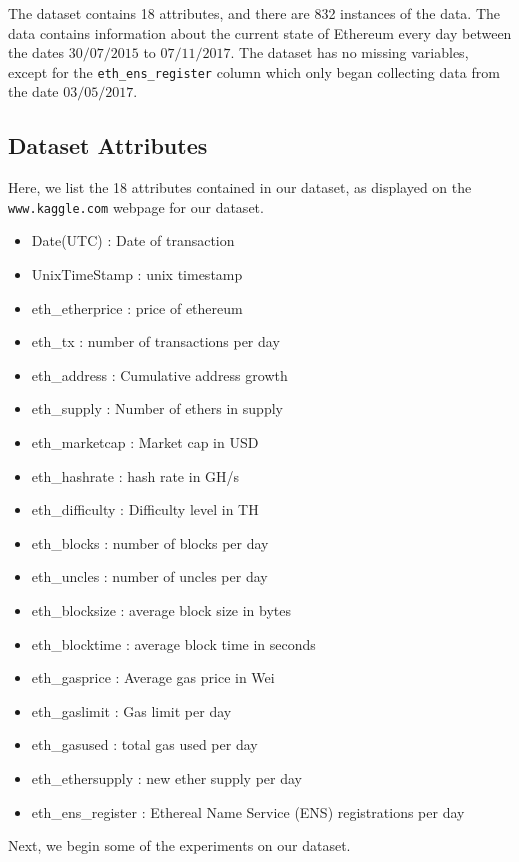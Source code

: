 \documentclass{article}
\begin{document}
The dataset contains 18 attributes, and there are 832 instances of the data. The data contains information about the current state of Ethereum every day between the dates $30/07/2015$ to $07/11/2017$. The dataset has no missing variables, except for the \texttt{eth\_ens\_register} column which only began collecting data from the date $03/05/2017$.

\subsection{Dataset Attributes}
Here, we list the 18 attributes contained in our dataset, as displayed on the \texttt{www.kaggle.com} webpage for our dataset\cite{dataset}.

\begin{center}
\begin{itemize}
\item Date(UTC) : Date of transaction
\item UnixTimeStamp : unix timestamp
\item eth\_etherprice : price of ethereum
\item eth\_tx : number of transactions per day
\item eth\_address : Cumulative address growth
\item eth\_supply : Number of ethers in supply
\item eth\_marketcap : Market cap in USD
\item eth\_hashrate : hash rate in GH/s
\item eth\_difficulty : Difficulty level in TH
\item eth\_blocks : number of blocks per day
\item eth\_uncles : number of uncles per day
\item eth\_blocksize : average block size in bytes
\item eth\_blocktime : average block time in seconds
\item eth\_gasprice : Average gas price in Wei
\item eth\_gaslimit : Gas limit per day
\item eth\_gasused : total gas used per day
\item eth\_ethersupply : new ether supply per day
\item eth\_ens\_register : Ethereal Name Service (ENS) registrations per day
\end{itemize}
\end{center}

\vspace{3mm}
Next, we begin some of the experiments on our dataset.
\end{document}
